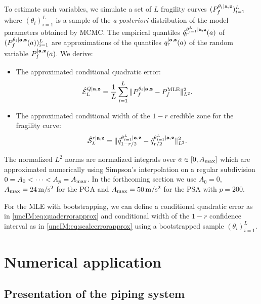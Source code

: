     To estimate such variables, we simulate a set of $L$ %
    fragility curves $( P_f^{\theta_i|\mathbf{a},\mathbf{z}})_{i=1}^L$ where $(\theta_i)_{i=1}^L$ is a sample of the \emph{a posteriori} distribution of the model parameters obtained by MCMC. The   empirical quantiles $\hat q_r^{\theta_{i=1}^L|\mathbf{a},\mathbf{z}}(a)$  of $( P_f^{\theta_i|\mathbf{a},\mathbf{z}}(a))_{i=1}^L$  are approximations of the quantiles $q_r^{|\mathbf{a},\mathbf{z}}(a)$ of the random variable $P_f^{|\mathbf{a},\mathbf{z}}(a)$.
    We derive:
        \begin{itemize}
            \item The approximated conditional quadratic error:
                \begin{equation} \label{uncIM:eq:quaderrorapprox}
                    \hat{\mathcal{E}}_{L}^{Q|\mathbf{a},\mathbf{z}} =\frac{1}{ L}\sum_{i=1}^L\| P_{f}^{\theta_i|\mathbf{a},\mathbf{z}} - P_f^{\mathrm{MLE}} \|_{L^2}^2.
                \end{equation}
            \item The approximated conditional width of the $1-r$ credible zone for the fragility curve:
                \begin{equation} \label{uncIM:eq:scaleerrorapprox}
                    \hat{\mathcal{S}}_L^{r|\mathbf{a},\mathbf{z}} = \|\hat q_{1-{r/2}}^{\theta_{i=1}^L|\mathbf{a},\mathbf{z}} - \hat q_{{r/2}}^{\theta_{i=1}^L|\mathbf{a},\mathbf{z}} \|_{L^2}^2.
                \end{equation}
        \end{itemize}
        The normalized $L^2$ norms are normalized integrals over $a\in [0,A_{\rm max}]$ which are approximated numerically using Simpson's interpolation on a regular subdivision $0=A_0<\dots<A_p=A_{\rm max}$. In the forthcoming section we use   $A_0=0$, $A_{\rm max}=24\,\mathrm{m/s^2}$ for the PGA and $A_{\rm max}=50\,\mathrm{m/s^2}$ for the PSA with $p=200$.

        For the MLE with bootstrapping, we can define a conditional quadratic error as in \cref{uncIM:eq:quaderrorapprox} and conditional width of the $1-r$ confidence interval as in \cref{uncIM:eq:scaleerrorapprox} using a bootstrapped sample $(\theta_i)_{i=1}^L$.


\section{Numerical application} \label{uncIM:sec:application}

\subsection{Presentation of the piping system}

